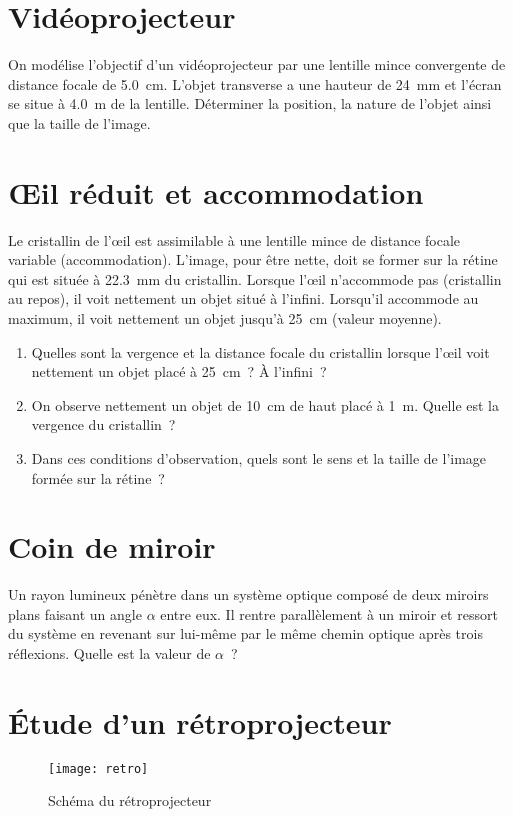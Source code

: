 \documentclass[a4paper, 12pt, final, garamond]{book}
\begin{document}
\section{Vidéoprojecteur}

On modélise l'objectif d'un vidéoprojecteur par une lentille mince convergente
de distance focale de \SI{5.0}{cm}. L'objet transverse a une hauteur de
\SI{24}{mm} et l'écran se situe à \SI{4.0}{m} de la lentille. Déterminer la
position, la nature de l'objet ainsi que la taille de l'image.

\section{Œil réduit et accommodation}
Le cristallin de l'œil est assimilable à une lentille mince de distance focale
variable (accommodation). L'image, pour être nette, doit se former sur la rétine
qui est située à \SI{22.3}{mm} du cristallin. Lorsque l'œil n'accommode pas
(cristallin au repos), il voit nettement un objet situé à l'infini. Lorsqu'il
accommode au maximum, il voit nettement un objet jusqu'à \SI{25}{cm} (valeur
moyenne).
\begin{enumerate}
    \item Quelles sont la vergence et la distance focale du cristallin lorsque
        l'œil voit nettement un objet placé à \SI{25}{cm}~? À l'infini~?
    \item On observe nettement un objet de \SI{10}{cm} de haut placé à
        \SI{1}{m}. Quelle est la vergence du cristallin~?
    \item Dans ces conditions d'observation, quels sont le sens et la taille de
        l'image formée sur la rétine~?
\end{enumerate}

\section{Coin de miroir}
Un rayon lumineux pénètre dans un système optique composé de deux miroirs plans
faisant un angle $\alpha$ entre eux. Il rentre parallèlement à un
miroir et ressort du système en revenant sur lui-même par le même chemin
optique après trois réflexions. Quelle est la valeur de $\alpha$~?

\section{Étude d'un rétroprojecteur}
\begin{wrapfigure}[10]{R}{.4\linewidth}
    \vspace*{-20pt}
    \centering
    \texttt{[image: retro]}
    \caption{Schéma du rétroprojecteur}
    \label{fig:retro}
\end{wrapfigure}
\end{document}
